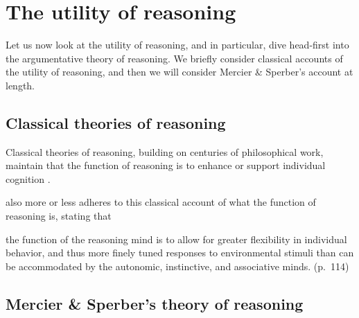 \section{The utility of reasoning}

Let us now look at the utility of reasoning, and in particular, dive head-first into the argumentative theory of reasoning.
We briefly consider classical accounts of the utility of reasoning, and then we will consider Mercier \& Sperber's account at length.

\subsection{Classical theories of reasoning}


Classical theories of reasoning, building on centuries of philosophical work, maintain that the function of reasoning is to enhance or support individual cognition \citep{MS11}.



\citet{Goel22} also more or less adheres to this classical account of what the function of reasoning is, stating that
\begin{quoting}
    the function of the reasoning mind is to allow for greater flexibility in individual behavior, and thus more finely tuned responses to environmental stimuli than can be accommodated by the autonomic, instinctive, and associative minds.
    \hfill (p.~114)
\end{quoting}

\subsection{Mercier \& Sperber's theory of reasoning}


